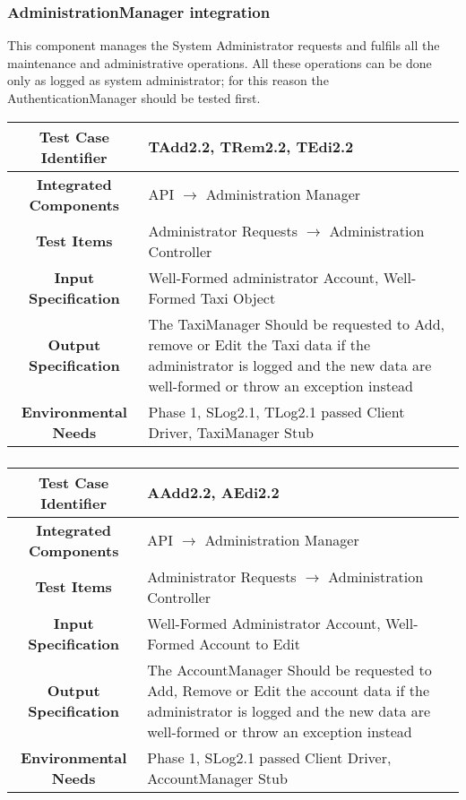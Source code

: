 \documentclass[11pt, a4paper,titlepage]{article}
\begin{document}
	 \subsubsection{AdministrationManager integration}
	This component manages the System Administrator requests and fulfils all the maintenance and administrative operations. All these operations can be done only as logged as system administrator; for this reason the AuthenticationManager should be tested first.
	\newline
	\begin{tabularx}{\textwidth}{| c|X|}
	 		\hline \textbf{Test Case Identifier} & \label{TAdd2.2}TAdd2.2, \label{TRem2.2}TRem2.2, \label{TEdi2.2}TEdi2.2 \\
	 		\hline \textbf{Integrated Components} &  API $\rightarrow $ Administration Manager \\
	 		\hline \textbf{Test Items} &  Administrator Requests  $\rightarrow $ Administration Controller\\
	 		\hline \textbf{Input Specification} &  Well-Formed administrator Account, Well-Formed Taxi Object \\
	 		\hline \textbf{Output Specification} & The TaxiManager Should be requested to Add, remove or Edit the Taxi data if the administrator is logged and the new data are well-formed or throw an exception instead\\
	 		\hline \textbf{Environmental Needs} &  Phase 1, SLog2.1, TLog2.1 passed \newline 
	 		Client Driver, TaxiManager Stub\\
	 		\hline
	 \end{tabularx}
	 \newline
	 \subsubsection{}
	\begin{tabularx}{\textwidth}{| c|X|}
		 	\hline \textbf{Test Case Identifier} & \label{AAdd2.2}AAdd2.2, \label{AEdi2.2}AEdi2.2 \\
		 	\hline \textbf{Integrated Components} &  API $\rightarrow $ Administration Manager \\
		 	\hline \textbf{Test Items} &  Administrator Requests  $\rightarrow $ Administration Controller\\
		 	\hline \textbf{Input Specification} &  Well-Formed Administrator Account, Well-Formed Account to Edit \\
		 	\hline \textbf{Output Specification} & The AccountManager Should be requested to Add, Remove or Edit the account data if the administrator is logged and the new data are well-formed or throw an exception instead\\
		 	\hline \textbf{Environmental Needs} &  Phase 1, SLog2.1 passed \newline 
		 	Client Driver, AccountManager Stub\\
		 	\hline
		 \end{tabularx}
		 \newline
\end{document}
